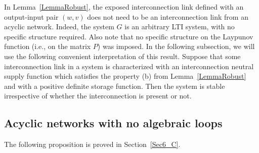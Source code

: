 \documentclass[11pt,a4paper,oneside,DIV=12,headings=small]{scrartcl}
\newtheorem{proposition}[theorem]{Proposition}
\theoremstyle{plain}
\begin{document}
In Lemma~\ref{LemmaRobust}, the exposed interconnection link defined with an output-input pair $(w, v)$ does not need to be an interconnection link from an acyclic network. Indeed, the system $G$ is an arbitrary LTI system, with no specific structure required. Also note that no specific structure on the Laypunov function (i.e., on the matrix $P$) was imposed. 
In the following subsection, we will use the following convenient interpretation of this result. Suppose that some interconnection link in a system is characterized with an interconnection neutral supply function which satisfies the property (b) from Lemma~\ref{LemmaRobust} and with a positive definite storage function. Then the system is stable irrespective of whether the interconnection is present or not.    

\subsection{Acyclic networks with no algebraic loops}   
The following proposition is proved in Section~\ref{Sec6_C}.
\end{document}
